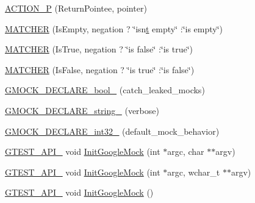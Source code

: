 \begin{DoxyCompactItemize}
\item 
\mbox{\hyperlink{namespacetesting_a3d58f0d746946064154cd257d368599d}{A\+C\+T\+I\+O\+N\+\_\+P}} (Return\+Pointee, pointer)
\item 
\mbox{\hyperlink{namespacetesting_a4fcb3f407119590471bea5a90a8d2dda}{M\+A\+T\+C\+H\+ER}} (Is\+Empty, negation ? \char`\"{}isn\textquotesingle{}\mbox{\hyperlink{_mutual_8h_a978d88b393c8a37dc2614c88788b3442}{t}} empty\char`\"{} \+:\char`\"{}is empty\char`\"{})
\item 
\mbox{\hyperlink{namespacetesting_ab2b645db6909220993662cf43ed0d9e8}{M\+A\+T\+C\+H\+ER}} (Is\+True, negation ? \char`\"{}is false\char`\"{} \+:\char`\"{}is true\char`\"{})
\item 
\mbox{\hyperlink{namespacetesting_a03fb223cceaefc67991ac36286dcbb34}{M\+A\+T\+C\+H\+ER}} (Is\+False, negation ? \char`\"{}is true\char`\"{} \+:\char`\"{}is false\char`\"{})
\item 
\mbox{\hyperlink{namespacetesting_a9dd7591091234b86ce48ce1aff6feeb5}{G\+M\+O\+C\+K\+\_\+\+D\+E\+C\+L\+A\+R\+E\+\_\+bool\+\_\+}} (catch\+\_\+leaked\+\_\+mocks)
\item 
\mbox{\hyperlink{namespacetesting_a4dd099d1d538f26a16fcc2f94011b37e}{G\+M\+O\+C\+K\+\_\+\+D\+E\+C\+L\+A\+R\+E\+\_\+string\+\_\+}} (verbose)
\item 
\mbox{\hyperlink{namespacetesting_a8db48e64b7ad3536f6ccf28ce39f9111}{G\+M\+O\+C\+K\+\_\+\+D\+E\+C\+L\+A\+R\+E\+\_\+int32\+\_\+}} (default\+\_\+mock\+\_\+behavior)
\item 
\mbox{\hyperlink{_obj__test_2lib_2googletest-release-1_88_81_2googletest_2include_2gtest_2internal_2gtest-port_8h_aa73be6f0ba4a7456180a94904ce17790}{G\+T\+E\+S\+T\+\_\+\+A\+P\+I\+\_\+}} void \mbox{\hyperlink{namespacetesting_a32b1c6db9ba5133ccabfa67616b3c041}{Init\+Google\+Mock}} (int $\ast$argc, char $\ast$$\ast$argv)
\item 
\mbox{\hyperlink{_obj__test_2lib_2googletest-release-1_88_81_2googletest_2include_2gtest_2internal_2gtest-port_8h_aa73be6f0ba4a7456180a94904ce17790}{G\+T\+E\+S\+T\+\_\+\+A\+P\+I\+\_\+}} void \mbox{\hyperlink{namespacetesting_a20fb86152763dddef67bc1dd8b090800}{Init\+Google\+Mock}} (int $\ast$argc, wchar\+\_\+t $\ast$$\ast$argv)
\item 
\mbox{\hyperlink{_obj__test_2lib_2googletest-release-1_88_81_2googletest_2include_2gtest_2internal_2gtest-port_8h_aa73be6f0ba4a7456180a94904ce17790}{G\+T\+E\+S\+T\+\_\+\+A\+P\+I\+\_\+}} void \mbox{\hyperlink{namespacetesting_a9276d4bc746722cb4fe99415c1dc778f}{Init\+Google\+Mock}} ()
\item 

\end{DoxyCompactItemize}
